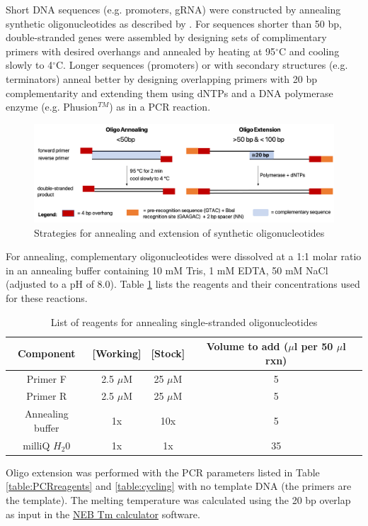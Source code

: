 Short DNA sequences (e.g. promoters, gRNA) were constructed by annealing synthetic oligonucleotides as described by \citep{Stemmer1995}. For sequences shorter than 50 bp, double-stranded genes were assembled by designing sets of complimentary primers with desired overhangs and annealed by heating at 95$^{\circ}$C and cooling slowly to 4$^{\circ}$C. 
Longer sequences (promoters) or with secondary structures (e.g. terminators) anneal better by designing overlapping primers with 20 bp complementarity and extending them using dNTPs and a DNA polymerase enzyme (e.g. Phusion$^{TM}$) as in a PCR reaction.
\begin{figure}[H]
    \centering
    \includegraphics[width=\hsize]{figs/oligos.png}
    \caption{Strategies for annealing and extension of synthetic oligonucleotides}
\end{figure}

For annealing, complementary oligonucleotides were dissolved at a 1:1 molar ratio in an annealing buffer containing 10 mM Tris, 1 mM EDTA, 50 mM NaCl (adjusted to a pH of 8.0). Table \ref{table:annealingpar} lists the reagents and their concentrations used for these reactions.

\begin{table}[H]
\centering
\begin{tabular}{|c|c|c|c|}
\hline
\textbf{Component} & \textbf{[Working]} & \textbf{[Stock]} & \textbf{\textbf{Volume to add ($\mu$l per 50 $\mu$l rxn)}} \\ \hline
Primer F & 2.5 $\mu$M & 25 $\mu$M & 5 \\ \hline
Primer R & 2.5 $\mu$M & 25 $\mu$M & 5 \\ \hline
Annealing buffer & 1x & 10x & 5 \\ \hline
milliQ $H_{2}0$ & 1x & 1x & 35 \\ \hline
\end{tabular}
\caption{List of reagents for annealing single-stranded oligonucleotides}
\label{table:annealingpar}
\end{table}

Oligo extension was performed with the PCR parameters listed in Table \ref{table:PCRreagents} and \ref{table:cycling} with no template DNA (the primers are the template). The melting temperature was calculated using the 20 bp overlap as input in the \href{https://tmcalculator.neb.com/#!/main}{NEB Tm calculator} software.

